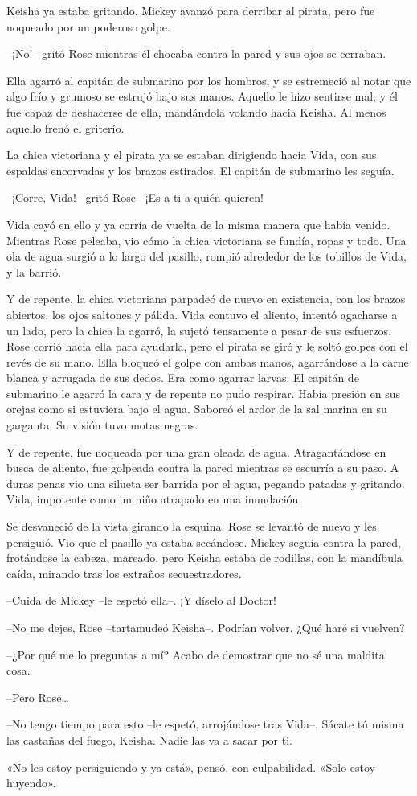 {Keisha ya estaba gritando. Mickey avanzó para derribar al pirata, pero
fue noqueado por un poderoso golpe.}

{--¡No! --gritó Rose mientras él chocaba contra la pared y sus ojos se
cerraban.}

{Ella agarró al capitán de submarino por los hombros, y se estremeció al
 notar que algo frío y grumoso se estrujó bajo sus manos. Aquello le hizo
 sentirse mal, y él fue capaz de deshacerse de ella, mandándola volando
hacia Keisha. Al menos aquello frenó el griterío.}

{La chica victoriana y el pirata ya se estaban dirigiendo hacia Vida,
 con sus espaldas encorvadas y los brazos estirados. El capitán de
submarino les seguía.}

{--¡Corre, Vida! --gritó Rose-- ¡Es a ti a quién quieren!}

{Vida cayó en ello y ya corría de vuelta de la misma manera que había
 venido. Mientras Rose peleaba, vio cómo la chica victoriana se fundía,
 ropas y todo. Una ola de agua surgió a lo largo del pasillo, rompió
alrededor de los tobillos de Vida, y la barrió.}

{Y de repente, la chica victoriana parpadeó de nuevo en existencia, con
 los brazos abiertos, los ojos saltones y pálida. Vida contuvo el
 aliento, intentó agacharse a un lado, pero la chica la agarró, la sujetó
 tensamente a pesar de sus esfuerzos. Rose corrió hacia ella para
 ayudarla, pero el pirata se giró y le soltó golpes con el revés de su
 mano. Ella bloqueó el golpe con ambas manos, agarrándose a la carne
 blanca y arrugada de sus dedos. Era como agarrar larvas. El capitán de
 submarino le agarró la cara y de repente no pudo respirar. Había presión
 en sus orejas como si estuviera bajo el agua. Saboreó el ardor de la sal
marina en su garganta. Su visión tuvo motas negras.}

{Y de repente, fue noqueada por una gran oleada de agua. Atragantándose
 en busca de aliento, fue golpeada contra la pared mientras se escurría a
 su paso. A duras penas vio una silueta ser barrida por el agua, pegando
 patadas y gritando. Vida, impotente como un niño atrapado en una
inundación.}

{Se desvaneció de la vista girando la esquina. Rose se levantó de nuevo
 y les persiguió. Vio que el pasillo ya estaba secándose. Mickey seguía
 contra la pared, frotándose la cabeza, mareado, pero Keisha estaba de
 rodillas, con la mandíbula caída, mirando tras los extraños
secuestradores.}

{--Cuida de Mickey --le espetó ella--. ¡Y díselo al Doctor!}

{--No me dejes, Rose --tartamudeó Keisha--. Podrían volver. ¿Qué haré si
vuelven?}

{--¿Por qué me lo preguntas a mí? Acabo de demostrar que no sé una
maldita cosa.}

{--Pero Rose\ldots{}}

{--No tengo tiempo para esto --le espetó, arrojándose tras Vida--.
 Sácate tú misma las castañas del fuego, Keisha. Nadie las va a sacar por
ti.}

{«No les estoy persiguiendo y ya está», pensó, con culpabilidad. «Solo
estoy huyendo».}
